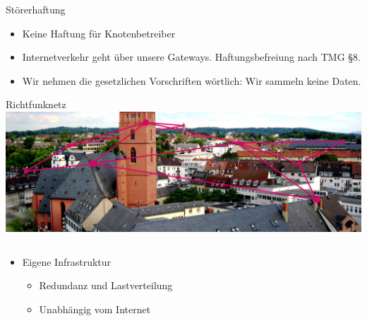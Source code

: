 \documentclass[t]{beamer}
\begin{document}
  \begin{frame}{Störerhaftung}
    \begin{itemize}
      \item Keine Haftung für Knotenbetreiber
      \item Internetverkehr geht über unsere Gateways. Haftungsbefreiung nach TMG \S8.
      \item Wir nehmen die gesetzlichen Vorschriften wörtlich: Wir sammeln keine Daten.
    \end{itemize}
  \end{frame}

  \begin{frame}{Richtfunknetz}
    \includegraphics[width=\textwidth]{images/banner-stadtkirche-darmstadt}
    \begin{columns}
      \begin{column}{0.65\textwidth}
        \begin{itemize}
          \item Eigene Infrastruktur
          \begin{itemize}
            \item Redundanz und Lastverteilung
            \item Unabhängig vom Internet
          \end{itemize}
        \end{itemize}
      \end{column}
      \begin{column}{0.25\textwidth}
        \begin{center}
          \vspace{-1.5cm}
          \hspace{-0.75cm}

\end{center}
\end{column}
\end{columns}
\end{frame}
\end{document}

